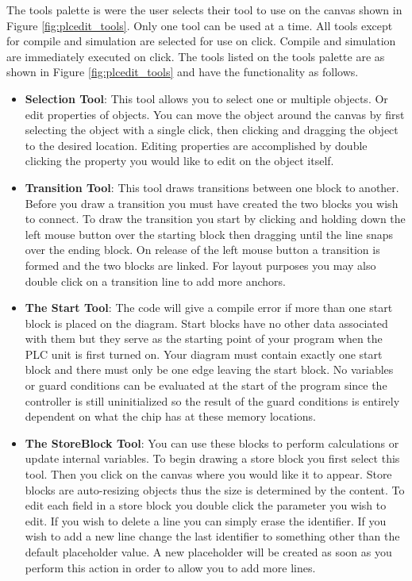 The tools palette is were the user selects their tool to use on the 
canvas shown in Figure \ref{fig:plcedit_tools}. Only one tool can be 
used at a time. All tools except for compile and simulation are selected
for use on click. Compile and simulation are immediately executed on click.
The tools listed on the tools palette are as shown in Figure  \ref{fig:plcedit_tools}
and have the functionality as follows.

\begin{itemize}
\item \textbf{Selection Tool}: This tool allows you to select one or multiple objects. Or edit properties of objects. You can move the object around the canvas by first selecting the object with a single click, then clicking and dragging the object to the desired location. Editing properties are accomplished by double clicking the property you would like to edit on the object itself.

\item \textbf{Transition Tool}: This tool draws transitions between one block to another. Before you draw a transition you must have created the two blocks you wish to connect. To draw the transition you start by clicking and holding down the left mouse button over the starting block then dragging until the line snaps over the ending block. On release of the left mouse button a transition is formed and the two blocks are linked. For layout purposes you may also double click on a transition  line to add more anchors.

\item \textbf{The Start Tool}: The code will give a compile error if more than one start block is placed on the diagram. Start blocks have no other data associated with them but they serve as the starting point of your program when the PLC unit is first turned on. Your diagram must contain exactly one start block and there must only be one edge leaving the start block. No variables or guard conditions can be evaluated at the start of the program since the controller is still uninitialized so the result of the guard conditions is entirely dependent on what the chip has at these memory locations.

\item \textbf{The StoreBlock Tool}: You can use these blocks to perform calculations or update internal variables. To begin drawing a store block you first select this tool. Then you click on the canvas where you would like it to appear. Store blocks are auto-resizing objects thus the size is determined by the content. To edit each field in a store block you double click the parameter you wish to edit. If you wish to delete a line you can simply erase the identifier. If you wish to add a new line change the last identifier to something other than the default placeholder value. A new placeholder will be created as soon as you perform this action in order to allow you to add more lines.


\end{itemize}
